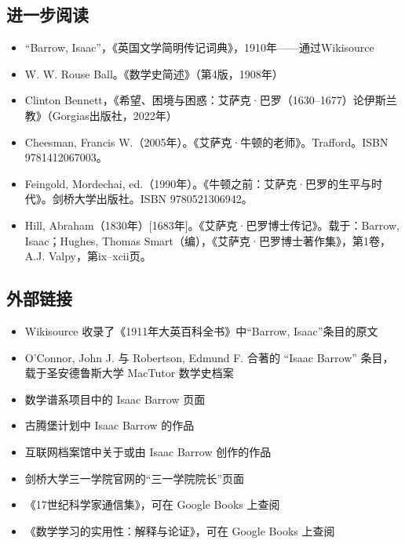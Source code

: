 \subsection{进一步阅读}
\begin{itemize}
\item “Barrow, Isaac”，《英国文学简明传记词典》，1910年——通过Wikisource
\item W. W. Rouse Ball。《数学史简述》（第4版，1908年）
\item Clinton Bennett，《希望、困境与困惑：艾萨克·巴罗（1630–1677）论伊斯兰教》（Gorgias出版社，2022年）
\item Cheesman, Francis W.（2005年）。《艾萨克·牛顿的老师》。Trafford。ISBN 9781412067003。
\item Feingold, Mordechai, ed.（1990年）。《牛顿之前：艾萨克·巴罗的生平与时代》。剑桥大学出版社。ISBN 9780521306942。
\item Hill, Abraham（1830年）[1683年]。《艾萨克·巴罗博士传记》。载于：Barrow, Isaac；Hughes, Thomas Smart（编），《艾萨克·巴罗博士著作集》，第1卷，A.J. Valpy，第ix–xcii页。
\end{itemize}
\subsection{外部链接}
\begin{itemize}
\item Wikisource 收录了《1911年大英百科全书》中“Barrow, Isaac”条目的原文
\item O'Connor, John J. 与 Robertson, Edmund F. 合著的 “Isaac Barrow” 条目，载于圣安德鲁斯大学 MacTutor 数学史档案
\item 数学谱系项目中的 Isaac Barrow 页面
\item 古腾堡计划中 Isaac Barrow 的作品
\item 互联网档案馆中关于或由 Isaac Barrow 创作的作品
\item 剑桥大学三一学院官网的“三一学院院长”页面
\item 《17世纪科学家通信集》，可在 Google Books 上查阅
\item 《数学学习的实用性：解释与论证》，可在 Google Books 上查阅
\end{itemize}